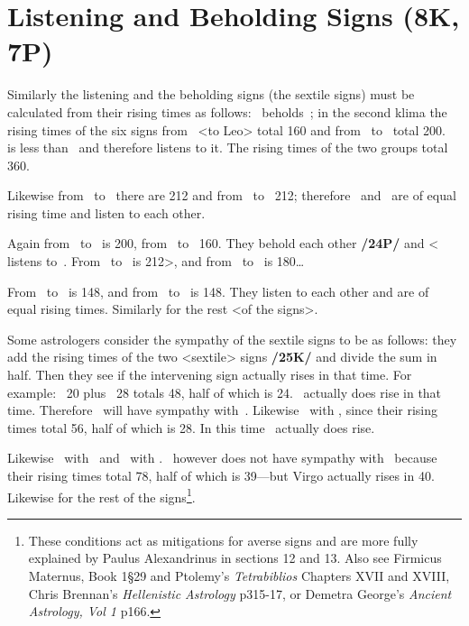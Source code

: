 \section{Listening and Beholding Signs (8K, 7P)}
Similarly the listening and the beholding signs (the sextile signs) must be calculated from their rising times as follows: \Pisces\, beholds \Taurus\,; in the second klima the rising times of the six signs from \Pisces\, <to Leo> total 160 and from \Taurus\, to \Libra\, total 200. \Pisces\, is less than \Taurus\, and therefore listens to it. The rising times of the two groups total 360. 

Likewise from \Gemini\, to \Scorpio\, there are 212 and from \Leo\, to \Capricorn\, 212; therefore \Gemini\, and \Leo\, are of equal rising time and listen to each other. 

Again from \Virgo\, to \Aquarius\, is 200, from \Scorpio\, to \Aries\, 160. They behold each other \textbf{/24P/} and <\Scorpio\, listens to \Virgo\,. From \Leo\, to \Capricorn\, is 212>, and from \Libra\, to \Pisces\, is 180\ldots 

From \Sagittarius\, to \Taurus\, is 148, and from \Aquarius\, to \Cancer\, is 148. They listen to each other and are of equal rising times. Similarly for the rest <of the signs>.

Some astrologers consider the sympathy of the sextile signs to be as follows: they add the rising times of the two <sextile> signs \textbf{/25K/} and divide the sum in half. Then they see if the intervening sign actually rises in that time. For example: \Aries\, 20 plus \Gemini\, 28 totals 48, half of which is 24. \Taurus\, actually does rise in that time. Therefore \Aries\, will have sympathy with \Gemini\,. Likewise \Taurus\, with \Cancer, since their rising times total 56, half of which is 28. In this time \Gemini\, actually does rise. 

Likewise \Gemini\, with \Leo\, and \Cancer\, with \Virgo. \Leo\, however does not have sympathy with \Libra\, because their rising times total 78, half of which is 39—but Virgo actually rises in 40. Likewise for the rest of the signs\footnote{These conditions act as mitigations for averse signs and are more fully explained by Paulus Alexandrinus in sections 12 and 13. Also see Firmicus Maternus, Book 1\S 29 and Ptolemy's \textsl{Tetrabiblios} Chapters XVII and XVIII, Chris Brennan's \textsl{Hellenistic Astrology} p315-17, or Demetra George's \textsl{Ancient Astrology, Vol 1} p166.}.

\newpage